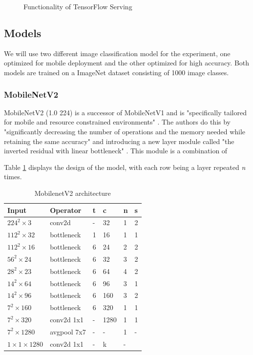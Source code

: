 \begin{figure}[H]
\centering

\caption{Functionality of TensorFlow Serving}
\label{fig:cloud}
\end{figure}
\subsection{Models}
\label{chap:models}
We will use two different image classification model for the experiment, one optimized for mobile deployment and the other optimized for high accuracy.
Both models are trained on a ImageNet dataset consisting of 1000 image classes.
\subsubsection{MobileNetV2}
MobileNetV2 (1.0 224) is a successor of MobileNetV1 and is "specifically tailored for mobile and resource
constrained environments" \cite{DBLP:journals/corr/abs-1801-04381}. The authors do this by "significantly decreasing the number of operations and the memory needed while retaining the same accuracy"  \cite{DBLP:journals/corr/abs-1801-04381} and introducing a new layer module called "the
inverted residual with linear bottleneck" \cite{DBLP:journals/corr/abs-1801-04381}.
This module is a combination of 

Table \ref{table:mobilenetArchi} displays the design of the model, with each row being a layer repeated \emph{n} times. 
\begin{table}[]

\centering
\caption{MobilenetV2 architecture \cite{DBLP:journals/corr/abs-1801-04381}}
\label{table:mobilenetArchi}
\begin{tabular}{@{}llllll@{}}

\toprule
Input & Operator & t & c & n & s \\ \midrule
$224^2\times 3$ & conv2d & - & 32 & 1 & 2 \\
$112^2\times 32$ & bottleneck & 1 & 16 & 1 & 1 \\
$112^2\times 16$ & bottleneck & 6 & 24 & 2 & 2 \\
$56^2\times 24$ & bottleneck & 6 & 32 & 3 & 2 \\
$28^2\times 23$ & bottleneck & 6 & 64 & 4 & 2 \\
$14^2\times 64$ & bottleneck & 6 & 96 & 3 & 1 \\
$14^2\times 96$ & bottleneck & 6 & 160 & 3 & 2 \\
$7^2\times 160$ & bottleneck & 6 & 320 & 1 & 1 \\
$7^2\times 320$ & conv2d 1x1 & - & 1280 & 1 & 1 \\
$7^2\times 1280$ & avgpool 7x7 & - & - & 1 & - \\
$1\times 1\times 1280$ & conv2d 1x1 & - & k & - &  \\ \bottomrule
\end{tabular}
\end{table}
